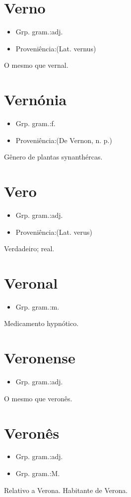 \documentclass{article}
\begin{document}
\section{Verno}
\begin{itemize}
\item {Grp. gram.:adj.}
\end{itemize}
\begin{itemize}
\item {Proveniência:(Lat. \textunderscore vernus\textunderscore )}
\end{itemize}
O mesmo que \textunderscore vernal\textunderscore .
\section{Vernónia}
\begin{itemize}
\item {Grp. gram.:f.}
\end{itemize}
\begin{itemize}
\item {Proveniência:(De \textunderscore Vernon\textunderscore , n. p.)}
\end{itemize}
Gênero de plantas synanthércas.
\section{Vero}
\begin{itemize}
\item {Grp. gram.:adj.}
\end{itemize}
\begin{itemize}
\item {Proveniência:(Lat. \textunderscore verus\textunderscore )}
\end{itemize}
Verdadeiro; real.
\section{Veronal}
\begin{itemize}
\item {Grp. gram.:m.}
\end{itemize}
Medicamento hypnótico.
\section{Veronense}
\begin{itemize}
\item {Grp. gram.:adj.}
\end{itemize}
O mesmo que \textunderscore veronês\textunderscore .
\section{Veronês}
\begin{itemize}
\item {Grp. gram.:adj.}
\end{itemize}
\begin{itemize}
\item {Grp. gram.:M.}
\end{itemize}
Relativo a Verona.
Habitante de Verona.
\end{document}
